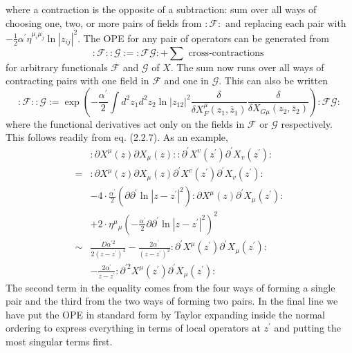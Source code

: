 where a contraction is the opposite of a subtraction: sum over all ways of choosing one, two, or more pairs of fields from $: \mathscr{F}:$ and replacing each pair with $-\frac{1}{2} \alpha^{\prime} \eta^{\mu_{i} \mu_{j}} \ln \left|z_{i j}\right|^{2}$.
The OPE for any pair of operators can be generated from
\begin{equation}
: \mathscr{F}:: \mathscr{G}:=: \mathscr{F} \mathscr{G}:+\sum \text { cross-contractions }
\end{equation}
for arbitrary functionals $\mathscr{F}$ and $\mathscr{G}$ of $X$. The sum now runs over all ways of contracting pairs with one field in $\mathscr{F}$ and one in $\mathscr{G} .$ This can also be written
\begin{equation}
: \mathscr{F}:: \mathscr{G}:=\exp \left(-\frac{\alpha^{\prime}}{2} \int d^{2} z_{1} d^{2} z_{2} \ln \left|z_{12}\right|^{2} \frac{\delta}{\delta X_{F}^{\mu}\left(z_{1}, \bar{z}_{1}\right)} \frac{\delta}{\delta X_{G \mu}\left(z_{2}, \bar{z}_{2}\right)}\right): \mathscr{F} \mathscr{G}:
\end{equation}
where the functional derivatives act only on the fields in $\mathscr{F}$ or $\mathscr{G}$ respectively. This follows readily from eq. (2.2.7). As an example,
\begin{equation}\label{2.2.11}
\begin{aligned}
&: \partial X^{\mu}(z) \partial X_{\mu}(z):: \partial^{\prime} X^{v}\left(z^{\prime}\right) \partial^{\prime} X_{v}\left(z^{\prime}\right): \\
=&: \partial X^{\mu}(z) \partial X_{\mu}(z) \partial^{\prime} X^{v}\left(z^{\prime}\right) \partial^{\prime} X_{v}\left(z^{\prime}\right): \\
&-4 \cdot \frac{\alpha^{\prime}}{2}\left(\partial \partial^{\prime} \ln \left|z-z^{\prime}\right|^{2}\right): \partial X^{\mu}(z) \partial^{\prime} X_{\mu}\left(z^{\prime}\right): \\
&+2 \cdot \eta^{\mu}{ }_{\mu}\left(-\frac{\alpha^{\prime}}{2} \partial \partial^{\prime} \ln \left|z-z^{\prime}\right|^{2}\right)^{2} \\
\sim &\frac{D \alpha^{\prime 2}}{2\left(z-z^{\prime}\right)^{4}}-\frac{2 \alpha^{\prime}}{\left(z-z^{\prime}\right)^{2}}: \partial^{\prime} X^{\mu}\left(z^{\prime}\right) \partial^{\prime} X_{\mu}\left(z^{\prime}\right): \\
&-\frac{2 \alpha^{\prime}}{z-z^{\prime}}: \partial^{\prime 2} X^{\mu}\left(z^{\prime}\right) \partial^{\prime} X_{\mu}\left(z^{\prime}\right):
\end{aligned}
\end{equation}
The second term in the equality comes from the four ways of forming a single pair and the third from the two ways of forming two pairs. In the final line we have put the OPE in standard form by Taylor expanding inside the normal ordering to express everything in terms of local operators at $z^{\prime}$ and putting the most singular terms first. \\

